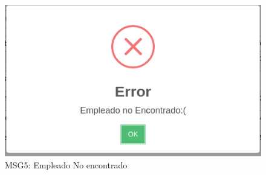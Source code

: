 \begin{figure}[htbp!]
	\begin{center}
		\includegraphics[width=\textwidth]{Pantallas/empleadoNoEncontrado}
		\caption{MSG5: Empleado No encontrado}
	\end{center}
\end{figure}